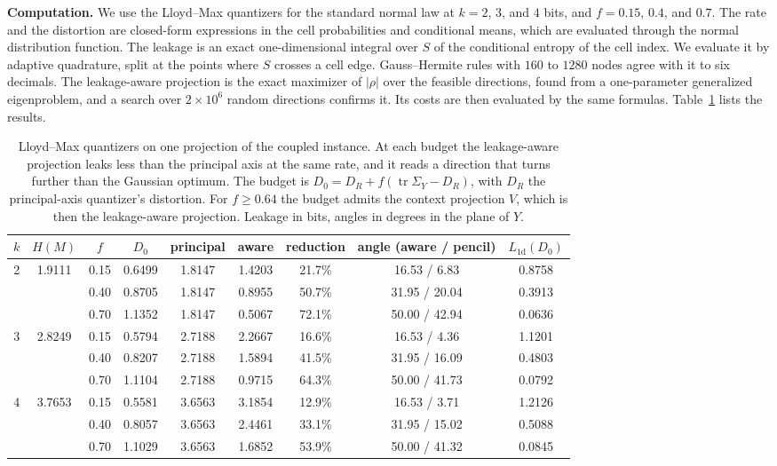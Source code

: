 \documentclass[11pt,onecolumn]{IEEEtran}
\newcommand{\tr}{\operatorname{tr}}
\begin{document}
\textbf{Computation.} We use the Lloyd--Max quantizers for the standard
normal law \cite{lloyd1982,max1960} at $k=2$, $3$, and $4$ bits, and
$f=0.15$, $0.4$, and $0.7$. The rate and the distortion are closed-form
expressions in the cell probabilities and conditional means, which are
evaluated through the normal distribution function. The leakage is an
exact one-dimensional integral over $S$ of the conditional entropy of the
cell index. We evaluate it by adaptive quadrature, split at the points
where $S$ crosses a cell edge. Gauss--Hermite rules with $160$ to $1280$
nodes agree with it to six decimals. The leakage-aware projection is the
exact maximizer of $|\rho|$ over the feasible directions, found from a
one-parameter generalized eigenproblem, and a search over $2\times10^6$
random directions confirms it. Its costs are then evaluated by the same
formulas. Table~\ref{tab:quant} lists the results.

\begin{table}[t]
\centering
\caption{Lloyd--Max quantizers on one projection of the coupled
instance. At each budget the leakage-aware projection leaks less than
the principal axis at the same rate, and it reads a direction that turns
further than the Gaussian optimum. The budget is
$D_0=D_R+f(\tr\Sigma_Y-D_R)$, with $D_R$ the principal-axis quantizer's
distortion. For $f\ge0.64$ the budget admits the context projection $V$,
which is then the leakage-aware projection. Leakage in bits, angles in
degrees in the plane of $Y$.}
\label{tab:quant}
\begin{tabular}{ccccccccc}
\hline
$k$ & $H(M)$ & $f$ & $D_0$ & principal & aware & reduction & angle (aware / pencil) & $L_{\mathrm{1d}}(D_0)$\\
\hline
2 & 1.9111 & 0.15 & 0.6499 & 1.8147 & 1.4203 & 21.7\% & 16.53 / \phantom{0}6.83 & 0.8758\\
  &        & 0.40 & 0.8705 & 1.8147 & 0.8955 & 50.7\% & 31.95 / 20.04 & 0.3913\\
  &        & 0.70 & 1.1352 & 1.8147 & 0.5067 & 72.1\% & 50.00 / 42.94 & 0.0636\\
\hline
3 & 2.8249 & 0.15 & 0.5794 & 2.7188 & 2.2667 & 16.6\% & 16.53 / \phantom{0}4.36 & 1.1201\\
  &        & 0.40 & 0.8207 & 2.7188 & 1.5894 & 41.5\% & 31.95 / 16.09 & 0.4803\\
  &        & 0.70 & 1.1104 & 2.7188 & 0.9715 & 64.3\% & 50.00 / 41.73 & 0.0792\\
\hline
4 & 3.7653 & 0.15 & 0.5581 & 3.6563 & 3.1854 & 12.9\% & 16.53 / \phantom{0}3.71 & 1.2126\\
  &        & 0.40 & 0.8057 & 3.6563 & 2.4461 & 33.1\% & 31.95 / 15.02 & 0.5088\\
  &        & 0.70 & 1.1029 & 3.6563 & 1.6852 & 53.9\% & 50.00 / 41.32 & 0.0845\\
\hline
\end{tabular}
\end{table}
\end{document}
